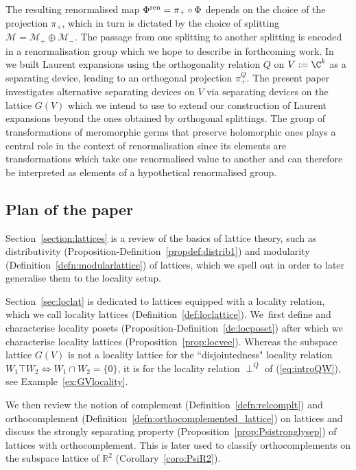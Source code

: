 \documentclass[pdftex]{sigma}
\numberwithin{equation}{section}
\newcommand{\R}{\mathbb{R}}
\newcommand{\loc}{locality\xspace}
\begin{document}
The resulting renormalised map $\Phi^{\rm ren}=\pi_+\circ \Phi$ depends on the choice of the projection $\pi_+$, which in turn is dictated by the choice of splitting $ {\mathcal M} = {\mathcal M}_+\oplus {\mathcal M}_-$. The passage from one splitting to another splitting is encoded in a renormalisation group which we hope to describe in forthcoming work. In~\cite{GPZ2} we built Laurent expansions using the orthogonality relation $Q$ on $V:=\C^k$ as a separating device, leading to an orthogonal projection $\pi_+^Q$. The present paper investigates alternative separating devices on $V $ via separating devices on the lattice $G(V)$ which we intend to use to extend our construction of Laurent expansions beyond the ones obtained by orthogonal splittings. The group of transformations of meromorphic germs that preserve holomorphic ones plays a central role in the context of renormalisation since its elements are transformations which take one renormalised value to another and can therefore be interpreted as elements of a hypothetical renormalised group.

\subsection{Plan of the paper}

Section~\ref{section:lattices} is a review of the basics of lattice theory, such as distributivity (Proposition-Defi\-ni\-tion~\ref{propdef:distrib1}) and modularity (Definition~\ref{defn:modularlattice}) of lattices, which we spell out in order to later generalise them to the locality setup.

Section~\ref{sec:loclat} is dedicated to lattices equipped with a locality relation, which we call locality lattices (Definition~\ref{def:loclattice}). We~first define and characterise locality posets (Proposition-Definition~\ref{de:locposet}) after which we characterise locality lattices (Proposition~\ref{prop:locvee}).
%
Whereas the subspace lattice $G(V)$ is not a
\loc lattice for the ``disjointedness" \loc relation $W_1\top W_2\Leftrightarrow W_1\cap W_2=\{0\}$, it is for the \loc relation
$\perp^Q$ of (\ref{eq:introQW}), see Example~\ref{ex:GVlocality}.

We then review the notion of complement (Definition~\ref{defn:relcomplt}) and orthocomplement (Definition~\ref{defn:orthocomplemented_lattice}) on lattices and discuss the strongly separating property (Proposition~\ref{prop:Psistronglysep}) of lattices with orthocomplement. This is later used to classify orthocomplements on the subspace lattice of $\R^2$ (Corollary~\ref{coro:PsiR2}).
\end{document}
